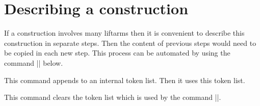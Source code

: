 \documentclass[a4paper,english,dvipsnames]{ltxdoc}
\begin{document}
\section{Describing a construction}
If a construction involves many liftarms then it is convenient to describe this construction in separate steps. Then the content of previous steps would need to be copied in each new step. This process can be automated by using the command |\liftarmconstruct| below.
\begin{command}{\liftarmconstruct{}}
This command appends  to an internal token list. Then it uses this token list.
\end{command}
\begin{command}{\liftarmconstructclear}
This command clears the token list which is used by the command |\liftarmconstruct|.


\end{command}
\end{document}
